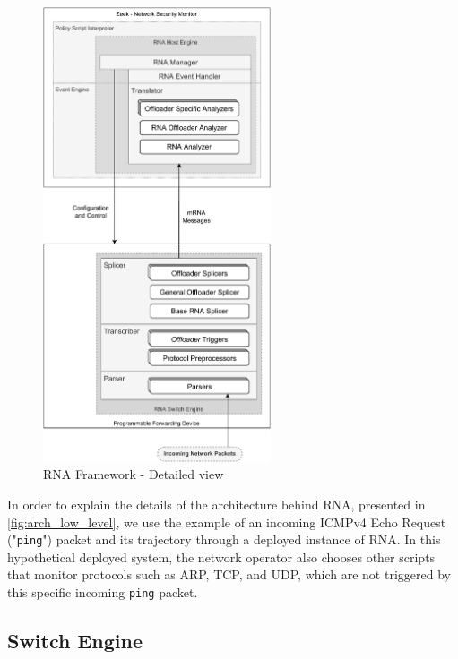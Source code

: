 \begin{figure}[ht!]
    \caption{RNA Framework - Detailed view}
    \begin{center}
        \includegraphics[width=0.6\textwidth]{images/arch_low_level.pdf}  
    \end{center}
    \label{fig:arch_low_level}
\end{figure}

In order to explain the details of the architecture behind RNA, presented in \autoref{fig:arch_low_level}, we use the example of an incoming ICMPv4 Echo Request ("\texttt{ping}") packet and its trajectory through a deployed instance of RNA. In this hypothetical deployed system, the network operator also chooses other scripts that monitor protocols such as ARP, TCP, and UDP, which are not triggered by this specific incoming \texttt{ping} packet.

\subsection{Switch Engine}

